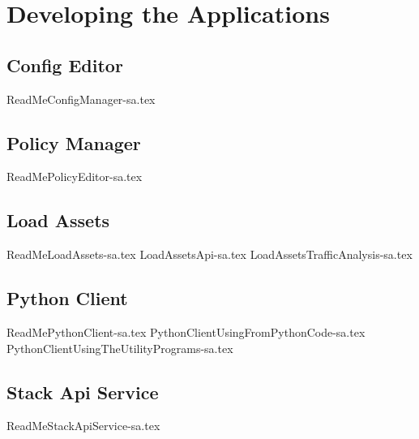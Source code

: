 
\chapter{Developing the Applications}
\label{intro05} %


\section{Config Editor}
{ReadMeConfigManager-sa.tex}

\section{Policy Manager}
{ReadMePolicyEditor-sa.tex}

\section{Load Assets}
{ReadMeLoadAssets-sa.tex}
{LoadAssetsApi-sa.tex}
{LoadAssetsTrafficAnalysis-sa.tex}

\section{Python Client}
{ReadMePythonClient-sa.tex}
{PythonClientUsingFromPythonCode-sa.tex}
{PythonClientUsingTheUtilityPrograms-sa.tex}

\section{Stack Api Service}
{ReadMeStackApiService-sa.tex}

